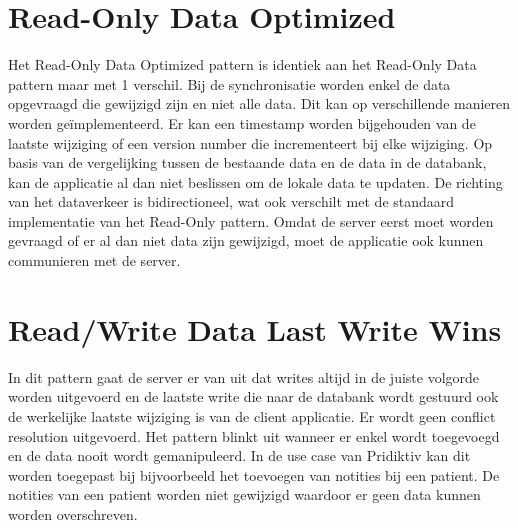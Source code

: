 \section{Read-Only Data Optimized}
Het Read-Only Data Optimized pattern is identiek aan het Read-Only Data pattern maar met 1 verschil. Bij de synchronisatie worden enkel de data opgevraagd die gewijzigd zijn en niet alle data. Dit kan op verschillende manieren worden ge\"implementeerd. Er kan een timestamp worden bijgehouden van de laatste wijziging of een version number die incrementeert bij elke wijziging. Op basis van de vergelijking tussen de bestaande data en de data in de databank, kan de applicatie al dan niet beslissen om de lokale data te updaten. De richting van het dataverkeer is bidirectioneel, wat ook verschilt met de standaard implementatie van het Read-Only pattern. Omdat de server eerst moet worden gevraagd of er al dan niet data zijn gewijzigd, moet de applicatie ook kunnen communieren met de server.
\section{Read/Write Data Last Write Wins}
In dit pattern gaat de server er van uit dat writes altijd in de juiste volgorde worden uitgevoerd en de laatste write die naar de databank wordt gestuurd ook de werkelijke laatste wijziging is van de client applicatie. Er wordt geen conflict resolution uitgevoerd. Het pattern blinkt uit wanneer er enkel wordt toegevoegd en de data nooit wordt gemanipuleerd. In de use case van Pridiktiv kan dit worden toegepast bij bijvoorbeeld het toevoegen van notities bij een patient. De notities van een patient worden niet gewijzigd waardoor er geen data kunnen worden overschreven.

